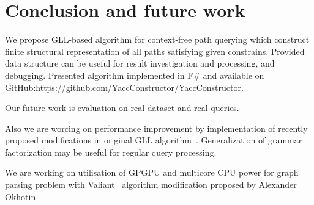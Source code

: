 \documentclass{sig-alternate} %
\begin{document}
\section{Conclusion and future work}
We propose GLL-based algorithm for context-free path querying which construct finite structural representation of all paths satisfying given constrains.
Provided data structure can be useful for result investigation and processing, and debugging.
Presented algorithm implemented in F\# and available on GitHub:\url{https://github.com/YaccConstructor/YaccConstructor}.

Our future work is evaluation on real dataset and real queries.

Also we are worcing on performance improvement by implementation of recently proposed modifications in original GLL algorithm~\cite{FGLL}.
Generalization of grammar factorization may be useful for regular query processing.

We are working on utilisation of GPGPU and multicore CPU power for graph parsing problem with Valiant~\cite{valiantParsingWithMatrixMultiplication} algorithm modification proposed by Alexander Okhotin~\cite{okhotin2014parsingWithMatrixMultiplication}





\end{document}

